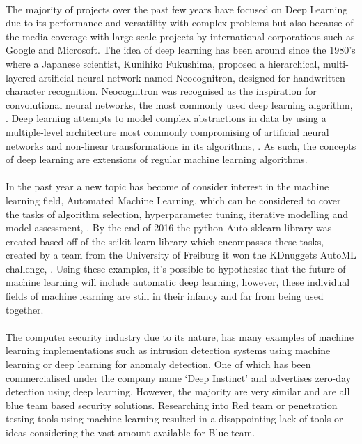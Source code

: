 \paragraph{}The majority of projects over the past few years have focused on Deep Learning due to its performance and versatility with complex problems but also because of the media coverage with large scale projects by international corporations such as Google and Microsoft. The idea of deep learning has been around since the 1980's where a Japanese scientist, Kunihiko Fukushima, proposed a hierarchical, multi-layered artificial neural network named Neocognitron, designed for handwritten character recognition. Neocognitron was recognised as the inspiration for convolutional neural networks, the most commonly used deep learning algorithm, \cite{DeepLearning}.  Deep learning attempts to model complex abstractions in data by using a multiple-level architecture most commonly compromising of artificial neural networks and non-linear transformations in its algorithms, \cite{CNNperf}.  As such, the concepts of deep learning are extensions of regular machine learning algorithms.
\paragraph{}In the past year a new topic has become of consider interest in the machine learning field, Automated Machine Learning, which can be considered to cover the tasks of algorithm selection, hyperparameter tuning, iterative modelling and model assessment, \cite{autoML}. By the end of 2016 the python Auto-sklearn library was created based off of the scikit-learn library which encompasses these tasks, created by a team from the University of Freiburg it won the KDnuggets AutoML challenge, \cite{auto-skl}. Using these examples, it's possible to hypothesize that the future of machine learning will include automatic deep learning, however, these individual fields of machine learning are still in their infancy and far from being used together.
\paragraph{}The computer security industry due to its nature, has many examples of machine learning implementations such as intrusion detection systems using machine learning or deep learning for anomaly detection. One of which has been commercialised under the company name ‘Deep Instinct' and advertises zero-day detection using deep learning. However, the majority are very similar and are all blue team based security solutions. Researching into Red team or penetration testing tools using machine learning resulted in a disappointing lack of tools or ideas considering the vast amount available for Blue team. 
